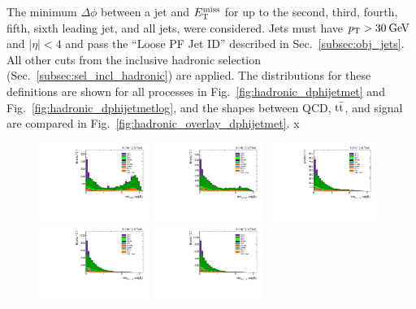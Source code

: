 The minimum $\Delta\phi$ between a jet and $E_\mathrm{T}^{\mathrm{miss}}$ for up to the second, third, fourth, fifth, sixth leading jet, and all jets, were considered. Jets must have $p_\mathrm{T}>30\:\mathrm{Ge\kern -0.1em V}$ and $|\eta|<4$ and pass the ``Loose PF Jet ID'' described in Sec.~\ref{subsec:obj_jets}. All other cuts from the inclusive hadronic selection (Sec.~\ref{subsec:sel_incl_hadronic}) are applied. The distributions for these definitions are shown for all processes in Fig.~\ref{fig:hadronic_dphijetmet} and Fig.~\ref{fig:hadronic_dphijetmetlog}, and the shapes between QCD, $\mathrm{t}\bar{\mathrm{t}}$, and signal are compared in Fig.~\ref{fig:hadronic_overlay_dphijetmet}.
x
\begin{figure}[htbp]
  \centering
  \includegraphics[width=0.32\textwidth]{figures/hadronic-incl-dphijetmet2.pdf}
  \includegraphics[width=0.32\textwidth]{figures/hadronic-incl-dphijetmet3.pdf}
  \includegraphics[width=0.32\textwidth]{figures/hadronic-incl-dphijetmet4.pdf} \\
  \includegraphics[width=0.32\textwidth]{figures/hadronic-incl-dphijetmet5.pdf}
  \includegraphics[width=0.32\textwidth]{figures/hadronic-incl-dphijetmet6.pdf}

\end{figure}
